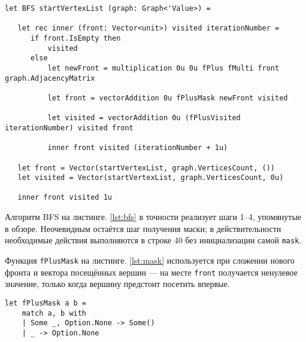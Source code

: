 \begin{lstlisting}[style=fsharp, caption={Функция, реализующая обход в ширину с применением матрично-векторных операций.}, label={lst:bfs},  frame=single, firstnumber=32]
let BFS startVertexList (graph: Graph<'Value>) =

   let rec inner (front: Vector<unit>) visited iterationNumber =
      if front.IsEmpty then
          visited
      else
          let newFront = multiplication 0u 0u fPlus fMulti front graph.AdjacencyMatrix

          let front = vectorAddition 0u fPlusMask newFront visited

          let visited = vectorAddition 0u (fPlusVisited iterationNumber) visited front

          inner front visited (iterationNumber + 1u)

   let front = Vector(startVertexList, graph.VerticesCount, ())
   let visited = Vector(startVertexList, graph.VerticesCount, 0u)

   inner front visited 1u
\end{lstlisting}

Алгоритм BFS на листинге. \ref{lst:bfs} в точности реализует шаги 1--4, упомянутые в обзоре. Неочевидным остаётся шаг получения маски; в действительности необходимые действия выполняются в строке 40 без инициализации самой \texttt{mask}.

Функция \texttt{fPlusMask} на листинге. \ref{lst:mask} используется при сложении нового фронта и вектора посещённых вершин --- на месте \texttt{front} получается ненулевое значение, только когда вершину предстоит посетить впервые. 

\newpage

\begin{lstlisting}[style=fsharp, caption={Функция, имитирующая поведение маски для обновления вектора-фронта.}, label={lst:mask},  frame=single, firstnumber=18]
let fPlusMask a b =
    match a, b with
    | Some _, Option.None -> Some()
    | _ -> Option.None
\end{lstlisting}

